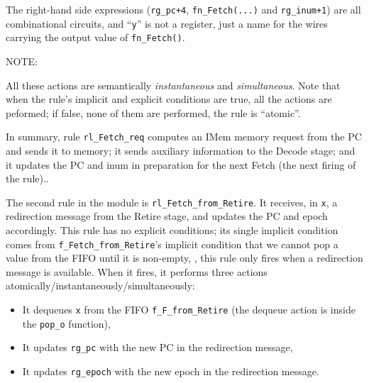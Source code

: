 The right-hand side expressions (\verb|rg_pc+4|, \verb|fn_Fetch(...)| and
\verb|rg_inum+1|) are all combinational circuits, and ``\verb|y|'' is
not a register, just a name for the wires carrying the output value of
\verb|fn_Fetch()|.


\vspace{1ex}

NOTE:

\vspace{1ex}


All these actions are semantically \emph{instantaneous} and
\emph{simultaneous}.  Note that when the rule's implicit and explicit
conditions are true, all the actions are peformed; if false, none of
them are performed, {\ie} the rule is ``atomic''.

In summary, rule \verb|rl_Fetch_req| computes an IMem memory request
from the PC and sends it to memory; it sends auxiliary information to
the Decode stage; and it updates the PC and inum in preparation for
the next Fetch (the next firing of the rule)..

The second rule in the module is \verb|rl_Fetch_from_Retire|. It
receives, in \verb|x|, a redirection message from the Retire stage,
and updates the PC and epoch accordingly.  This rule has no explicit
conditions; its single implicit condition comes from
\verb|f_Fetch_from_Retire|'s implicit condition that we cannot pop a
value from the FIFO until it is non-empty, {\ie}, this rule only fires
when a redirection message is available.  When it fires, it performs
three actions atomically/instantaneously/simultaneously:
 
\begin{itemize}

 \item It dequeues \verb|x| from the FIFO \verb|f_F_from_Retire| (the
       dequeue action is inside the \verb|pop_o| function),
 \item It updates \verb|rg_pc| with the new PC in the redirection message,
 \item It updates \verb|rg_epoch| with the new epoch in the redirection message.

\end{itemize}

